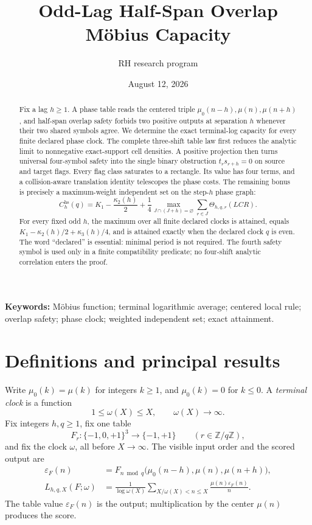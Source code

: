 \documentclass[11pt]{article}
\title{Odd-Lag Half-Span Overlap M\"obius Capacity}
\author{RH research program}
\date{August 12, 2026}
\theoremstyle{definition}
\theoremstyle{remark}
\newcommand{\mob}{\mu}
\newcommand{\T}{\{-1,0,+1\}}
\newcommand{\Z}{\mathbb Z}
\newcommand{\hcap}{C^{\mathrm{hs}}}
\begin{document}
\maketitle

\begin{abstract}
Fix a lag \(h\geq1\).  A phase table reads the centered triple
\(\mob_0(n-h),\mob(n),\mob(n+h)\), and half-span overlap safety forbids
two positive outputs at separation \(h\) whenever their two shared
symbols agree.  We determine the exact terminal-log capacity for every
finite declared phase clock.  The complete three-shift table law first
reduces the analytic limit to nonnegative exact-support cell densities.
A positive projection then turns universal four-symbol safety into the
single binary obstruction \(t_rs_{r+h}=0\) on source and target flags.
Every flag class saturates to a rectangle.  Its value has four terms,
and a collision-aware translation identity telescopes the phase costs.
The remaining bonus is precisely a maximum-weight independent set on
the step-\(h\) phase graph:
\[
 \hcap_h(q)=K_1-\frac{\kappa_2(h)}2+
 \frac14\max_{J\cap(J+h)=\varnothing}
 \sum_{r\in J}\Theta_{h,q,r}(LCR).
\]
For every fixed odd \(h\), the maximum over all finite declared clocks is
attained, equals
\(K_1-\kappa_2(h)/2+\kappa_3(h)/4\), and is attained exactly when the
declared clock \(q\) is even.  The word ``declared'' is essential:
minimal period is not required.  The fourth safety symbol is used only
in a finite compatibility predicate; no four-shift analytic correlation
enters the proof.
\end{abstract}

\noindent\textbf{Keywords:} M\"obius function; terminal logarithmic
average; centered local rule; overlap safety; phase clock; weighted
independent set; exact attainment.

\section{Definitions and principal results}

Write \(\mob_0(k)=\mob(k)\) for integers \(k\geq1\), and
\(\mob_0(k)=0\) for \(k\leq0\).  A \emph{terminal clock} is a function
\begin{equation}
 1\leq\omega(X)\leq X,
 \qquad \omega(X)\longrightarrow\infty.
 \label{eq:terminal-clock}
\end{equation}
Fix integers \(h,q\geq1\), fix one table
\[
 F_r:\T^3\longrightarrow\{-1,+1\}
 \qquad(r\in\Z/q\Z),
\]
and fix the clock \(\omega\), all before \(X\to\infty\).  The visible
input order and the scored output are
\begin{align}
 \varepsilon_F(n)
 &=F_{n\bmod q}\bigl(\mob_0(n-h),\mob(n),\mob(n+h)\bigr),
 \label{eq:centered-output}\\
 L_{h,q,X}(F;\omega)
 &=\frac1{\log\omega(X)}
 \sum_{X/\omega(X)<n\leq X}
 \frac{\mob(n)\varepsilon_F(n)}n.
 \label{eq:terminal-functional}
\end{align}
The table value \(\varepsilon_F(n)\) is the output; multiplication by
the center \(\mob(n)\) produces the score.
\end{document}

